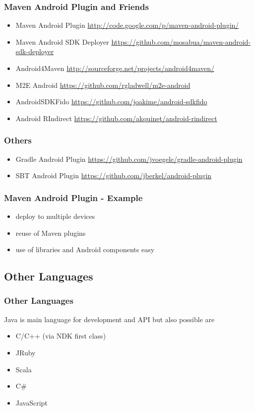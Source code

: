\documentclass{beamer}
\newcommand{\surl}[1] {{\tiny \url{#1}}}
\begin{document}
    \begin{frame}
      \frametitle{Maven Android Plugin and Friends}
      \begin{itemize}
       \item Maven Android Plugin \surl{http://code.google.com/p/maven-android-plugin/}
       \item Maven Android SDK Deployer \surl{https://github.com/mosabua/maven-android-sdk-deployer}
       \item Android4Maven \surl{http://sourceforge.net/projects/android4maven/}
       \item M2E Android \surl{https://github.com/rgladwell/m2e-android}
       \item AndroidSDKFido \surl{https://github.com/joakime/android-sdkfido}
       \item Android RIndirect \surl{https://github.com/akquinet/android-rindirect}
      \end{itemize}

    \end{frame}

    \begin{frame}
      \frametitle{Others}
      \begin{itemize}
       \item Gradle Android Plugin \url{https://github.com/jvoegele/gradle-android-plugin}
       \item SBT Android Plugin \url{https://github.com/jberkel/android-plugin}
      \end{itemize}
    \end{frame}

    \begin{frame}
      \frametitle{Maven Android Plugin - Example}
      \begin{itemize}
       \item deploy to multiple devices
       \item reuse of Maven plugins
       \item use of libraries and Android components easy
      \end{itemize}
    \end{frame}

  \subsection{Other Languages}
    \begin{frame}
      \frametitle{Other Languages}
      Java is main language for development and API but also possible are 
      \begin{itemize}
      \item C/C++ (via NDK first class)
      \item JRuby
      \item Scala
      \item C\#
      \item JavaScript
      \end{itemize}
    \end{frame}
\end{document}
